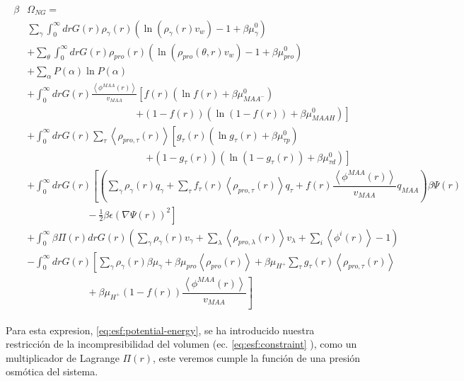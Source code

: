 \begin{align}
	\begin{aligned}
		\beta&\Omega_{NG}=\\&  \sum_{\gamma}\int_0^\infty{dr G(r)\rho_\gamma(r)\left(\ln \left(\rho_\gamma (r)v_w\right) -1 + \beta\mu^0_\gamma\right)} \\
		& +\sum_\theta \int_0^\infty{dr G(r)\rho_{pro}(r)\left(\ln (\rho_{pro}(\theta,r)v_w)-1 + \beta\mu^0_{pro} \right)} \\
		& + \sum_{\alpha}{P(\alpha)\ln P(\alpha)} \\
		& +\int_0^\infty drG(r) \frac{\left<\phi^{MAA}(r)\right>}{v_{MAA}} \left[f(r)(\ln f(r)+ \beta\mu^0_{MAA^-})\right.\\
		&\qquad \qquad \qquad\qquad \qquad \quad \left.+(1-f(r))(\ln (1-f(r))+\beta\mu^0_{MAAH})\right] \\
		& +\int_0^\infty drG(r)\sum_\tau \left<\rho_{pro,\tau}(r)\right> \left[g_\tau(r)(\ln g_\tau(r)+ \beta\mu^0_{\tau p})\right.\\
		&\qquad\qquad \qquad\qquad \qquad \qquad\left.+(1-g_\tau(r))(\ln (1-g_\tau(r))+\beta\mu^0_{\tau d})\right] \\
		& +  \int_0^\infty drG(r)\left[\left(\sum_{\gamma } {\rho_\gamma(r) q_\gamma + \sum_\tau{f_\tau(r) \left<\rho_{pro,\tau}(r)\right> q_\tau} +  f(r)\dfrac{\left<\phi^{MAA}(r)\right>}{v_{MAA}}q_{MAA}}\right)\beta\Psi(r) \right.\\  &\left. \hspace{6em}-\frac{1}{2}\beta\epsilon(\nabla\Psi(r))^2 \right]\\
		&+ \int_0^\infty \beta\Pi(r) drG(r){\left(\sum_{\gamma}\rho_\gamma(r) v_\gamma + \sum_{\lambda}{\left<\rho_{pro,\lambda}(r)\right>}{v_\lambda} + \sum_i\left<\phi^i(r)\right> -1\right)}\\
		& -\int_0^\infty drG(r)\left[\sum_{\gamma }{\rho_\gamma(r)\beta\mu_\gamma}
		+ \beta\mu_{pro} \left<\rho_{pro}(r)\right>
		+\beta\mu_{H^+}\sum_{\tau}{g_\tau(r)\left<\rho_{pro,\tau}(r)\right> } \right.\\
		& \left. \hspace{6em} +\beta\mu_{H^+}(1-f(r))\dfrac{\left<\phi^{MAA}(r)\right>}{v_{MAA}}\right]%
	\end{aligned}
	\label{eq:esf:potential-energy}
\end{align}


Para esta expresion,  \ref{eq:esf:potential-energy}, se ha introducido nuestra restricci\'on de la incompresibilidad del volumen (ec. \ref{eq:esf:constraint} ), como un  multiplicador  de  Lagrange $\Pi(r)$, este veremos cumple la funci\'on de una presi\'on osm\'otica del sistema. 

